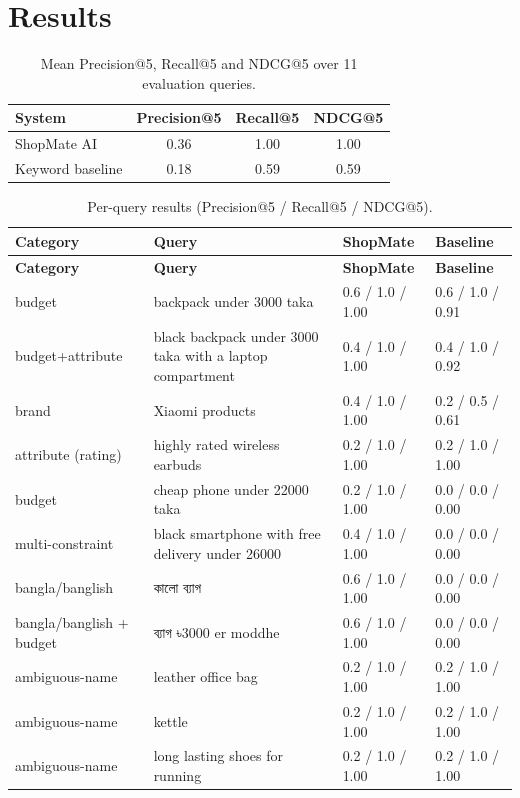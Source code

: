 \documentclass[12pt,a4paper]{report}
\newcommand{\bn}[1]{{\bengalifont #1}}
\begin{document}
\section{Results}
\begin{table}[H]
\centering
\begin{tabular}{lccc}
\toprule
\textbf{System} & \textbf{Precision@5} & \textbf{Recall@5} & \textbf{NDCG@5} \\
\midrule
ShopMate AI & 0.36 & 1.00 & 1.00 \\
Keyword baseline & 0.18 & 0.59 & 0.59 \\
\bottomrule
\end{tabular}
\caption{Mean Precision@5, Recall@5 and NDCG@5 over 11 evaluation queries.}
\label{tab:eval-summary}
\end{table}

\begin{longtable}{p{2.6cm}p{4.4cm}p{2.7cm}p{2.7cm}}
\caption{Per-query results (Precision@5 / Recall@5 / NDCG@5).}\label{tab:eval-detail} \\
\toprule
\textbf{Category} & \textbf{Query} & \textbf{ShopMate} & \textbf{Baseline} \\
\midrule
\endfirsthead
\toprule
\textbf{Category} & \textbf{Query} & \textbf{ShopMate} & \textbf{Baseline} \\
\midrule
\endhead
budget & backpack under 3000 taka & 0.6 / 1.0 / 1.00 & 0.6 / 1.0 / 0.91 \\
budget+attribute & black backpack under 3000 taka with a laptop compartment & 0.4 / 1.0 / 1.00 & 0.4 / 1.0
/ 0.92 \\
brand & Xiaomi products & 0.4 / 1.0 / 1.00 & 0.2 / 0.5 / 0.61 \\
attribute (rating) & highly rated wireless earbuds & 0.2 / 1.0 / 1.00 & 0.2 / 1.0 / 1.00 \\
budget & cheap phone under 22000 taka & 0.2 / 1.0 / 1.00 & 0.0 / 0.0 / 0.00 \\
multi-constraint & black smartphone with free delivery under 26000 & 0.4 / 1.0 / 1.00 & 0.0 / 0.0 / 0.00 \\
bangla/banglish & \bn{কালো ব্যাগ} & 0.6 / 1.0 / 1.00 & 0.0 / 0.0 / 0.00 \\
bangla/banglish + budget & \bn{ব্যাগ ৳3000} er moddhe & 0.6 / 1.0 / 1.00 & 0.0 / 0.0 / 0.00 \\
ambiguous-name & leather office bag & 0.2 / 1.0 / 1.00 & 0.2 / 1.0 / 1.00 \\
ambiguous-name & kettle & 0.2 / 1.0 / 1.00 & 0.2 / 1.0 / 1.00 \\
ambiguous-name & long lasting shoes for running & 0.2 / 1.0 / 1.00 & 0.2 / 1.0 / 1.00 \\
\bottomrule
\end{longtable}
\end{document}
